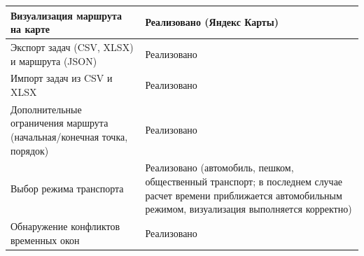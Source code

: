 \begin{table}[H]
\begin{tabularx}{\linewidth}{|L|L|}
            Визуализация маршрута на карте                                          & Реализовано (Яндекс Карты)                                                                                                                          \\ \hline
            Экспорт задач (CSV, XLSX) и маршрута (JSON)                             & Реализовано                                                                                                                                         \\ \hline
            Импорт задач из CSV и XLSX                                              & Реализовано                                                                                                                                         \\ \hline
            Дополнительные ограничения маршрута (начальная/конечная точка, порядок) & Реализовано                                                                                                                                         \\ \hline
            Выбор режима транспорта                                                 & Реализовано (автомобиль, пешком, общественный транспорт; в последнем случае расчет времени приближается автомобильным режимом, визуализация выполняется корректно) \\ \hline
            Обнаружение конфликтов временных окон                                   & Реализовано                                                                                                                                         \\ \hline
      \end{tabularx}
\end{table}

